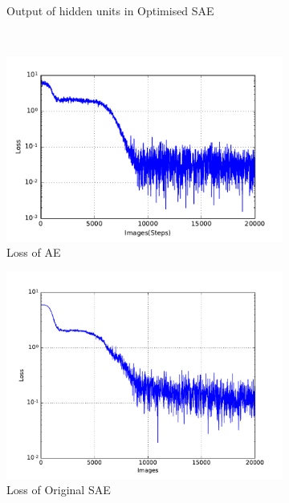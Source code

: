 \begin{figure}
\begin{subfigure}[t]{0.32\textwidth}
		\caption{Output of hidden units in Optimised SAE}
	\end{subfigure}\\
	\begin{subfigure}[t]{0.32\textwidth}
		\includegraphics[width=\textwidth]{pics_sdlm/21_exp_AE_noise/exp3_loss_s_2.pdf}
		\caption{Loss of AE}
	\end{subfigure}
	\begin{subfigure}[t]{0.32\textwidth}
		\includegraphics[width=\textwidth]{pics_sdlm/00_exp_SAE_Orig/exp3_mse_nons_2.pdf}
		\caption{Loss of Original SAE}
	\end{subfigure}
	\begin{subfigure}[t]{0.32\textwidth}

\end{subfigure}
\end{figure}
